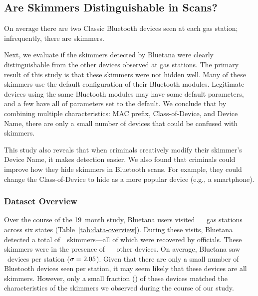 \subsection{Are Skimmers Distinguishable in Scans?} %
\label{sec:bluetooth:scans}

\begin{table}
    \centering
    
    \caption{On average there are two Classic Bluetooth devices seen at each gas
    station; infrequently, there are skimmers.
    }
    \label{tab:data-overview}
\end{table}





Next, we evaluate if 
the skimmers detected by Bluetana were clearly distinguishable from the other devices observed at gas stations. 
%
% 
The primary result of this study is that these skimmers were not
hidden well.
%
Many of these skimmers use the default configuration of their Bluetooth
modules.
%
Legitimate devices using the same Bluetooth modules may have some default parameters, and a few have all of parameters set to the default.
%
We conclude that by combining multiple characteristics: MAC prefix, Class-of-Device,
and Device Name, there are only a small number of devices that could be
confused with skimmers.

This study also reveals that when criminals creatively modify their skimmer's
Device Name, it makes detection easier.
%
We also found that criminals could improve how they hide skimmers in Bluetooth
scans.
%
For example, they could change the Class-of-Device to hide as a more popular
device (e.g., a smartphone).

\subsubsection*{Dataset Overview} %

Over the course of the 19~month study, Bluetana users visited ~\visitedgasstations~ gas
stations across six states (Table~\ref{tab:data-overview}).
%
During these visits, Bluetana detected a total of~\totalskimmers~skimmers---all of which were recovered by officials.
%
These skimmers were in the presence of ~\totalbtobserved~ other devices.
% 
On average, Bluetana saw \averageclassicBTperstation~devices per
station ($\sigma = 2.05$).
%
Given that there are only a small number of Bluetooth devices seen per station,
it may seem likely that these devices are all skimmers.
%
However, only a small fraction (\pctmatchskimmer) of these devices matched the
characteristics of the skimmers we observed during the course of our study. 
%

